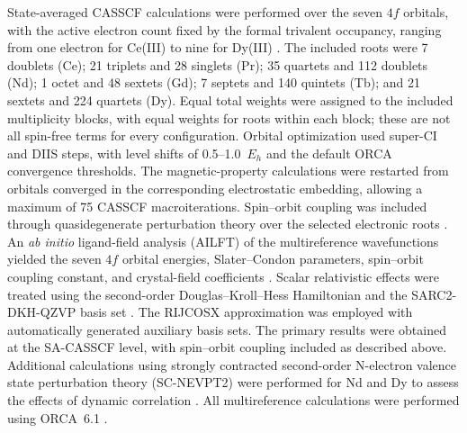 \documentclass[final,1p,times]{elsarticle}
\DeclareRobustCommand{\rev}[1]{{\color{revcolor}#1}}
\begin{document}
\rev{State-averaged CASSCF calculations were performed over the seven $4f$ orbitals, with the active electron count fixed by the formal trivalent occupancy, ranging from one electron for Ce(III) to nine for Dy(III) \cite{roos1980}.} \rev{The included roots were 7 doublets (Ce); 21 triplets and 28 singlets (Pr); 35 quartets and 112 doublets (Nd); 1 octet and 48 sextets (Gd); 7 septets and 140 quintets (Tb); and 21 sextets and 224 quartets (Dy).} \rev{Equal total weights were assigned to the included multiplicity blocks, with equal weights for roots within each block; these are not all spin-free terms for every configuration.} \rev{Orbital optimization used super-CI and DIIS steps, with level shifts of 0.5--1.0~$E_h$ and the default ORCA convergence thresholds.} \rev{The magnetic-property calculations were restarted from orbitals converged in the corresponding electrostatic embedding, allowing a maximum of 75 CASSCF macroiterations. Spin--orbit coupling was included through quasidegenerate perturbation theory over the selected electronic roots \cite{malmqvist2002}. An \textit{ab initio} ligand-field analysis (AILFT) of the multireference wavefunctions yielded the seven $4f$ orbital energies, Slater--Condon parameters, spin--orbit coupling constant, and crystal-field coefficients \cite{stevens1952,hutchings1964,rudowicz1985,newman2000,jensen1991,atanasov2012,aravena2016,ungur2017,chibotaru2012}. Scalar relativistic effects were treated using the second-order Douglas--Kroll--Hess Hamiltonian and the SARC2-DKH-QZVP basis set \cite{reiher2004,pantazis2009,aravena2016basis}. The RIJCOSX approximation was employed with automatically generated auxiliary basis sets. The primary results were obtained at the SA-CASSCF level, with spin--orbit coupling included as described above. Additional calculations using strongly contracted second-order N-electron valence state perturbation theory (SC-NEVPT2) were performed for Nd and Dy to assess the effects of dynamic correlation \cite{angeli2001,angeli2002}. All multireference calculations were performed using ORCA~6.1 \cite{neese2022,neese2012}.}
\end{document}
